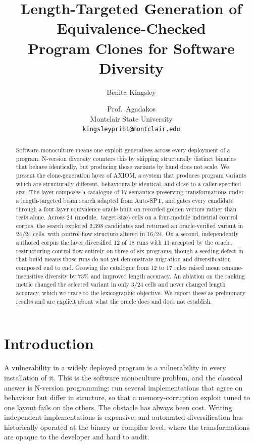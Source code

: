 \documentclass[10pt,twocolumn]{article}
\title{\vspace{-1.5em}\textbf{Length-Targeted Generation of Equivalence-Checked\\
Program Clones for Software Diversity}\vspace{-0.5em}}
\author{
  Benita Kingsley \and Prof.~Agadakos \\
  \small Montclair State University \\
  \small \texttt{kingsleyprib1@montclair.edu}
}
\date{}
\begin{document}
\maketitle

\begin{abstract}
Software monoculture means one exploit generalises across every deployment of
a program. N-version diversity counters this by shipping structurally distinct
binaries that behave identically, but producing those variants by hand does not
scale. We present the clone-generation layer of AXIOM, a system that produces
program variants which are structurally different, behaviourally identical, and
close to a caller-specified size. The layer composes a catalogue of 17
semantics-preserving transformations under a length-targeted beam search adapted
from Auto-SPT, and gates every candidate through a four-layer equivalence oracle
built on recorded golden vectors rather than tests alone. Across 24
(module,~target-size) cells on a four-module industrial control corpus, the
search explored 2{,}398 candidates and returned an oracle-verified variant in
24/24 cells, with control-flow structure altered in 16/24. On a second,
independently authored corpus the layer diversified 12 of 18 runs with 11
accepted by the oracle, restructuring control flow entirely on three of six
programs, though a seeding defect in that build means those runs do not yet
demonstrate migration and diversification composed end to end. Growing the catalogue
from 12 to 17 rules raised mean rename-insensitive diversity by 73\% and
improved length accuracy. An ablation on the ranking metric changed the selected
variant in only 3/24 cells and never changed length accuracy, which we trace to
the lexicographic objective. We report these as preliminary results and are
explicit about what the oracle does and does not establish.
\end{abstract}

\section{Introduction}

A vulnerability in a widely deployed program is a vulnerability in every
installation of it. This is the software monoculture problem, and the classical
answer is N-version programming: run several implementations that agree on
behaviour but differ in structure, so that a memory-corruption exploit tuned to
one layout fails on the others. The obstacle has always been cost. Writing
independent implementations is expensive, and automated diversification has
historically operated at the binary or compiler level, where the transformations
are opaque to the developer and hard to audit.
\end{document}

